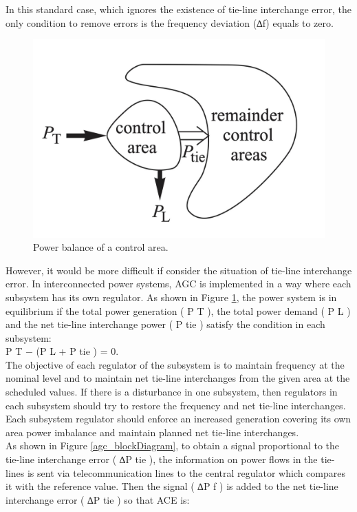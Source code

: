 \documentclass{report}
\begin{document}
In this standard case, which ignores the existence of tie-line interchange error, the only condition to remove errors is the frequency deviation (∆f) equals to zero.\\

\begin{figure}[htb]
\centering
\includegraphics[width = .618\textwidth]{Figure/controller_powerBalance.png}
\caption{Power balance of a control area.}
\label{controller_powerBalance}
\end{figure}

However, it would be more difficult if consider the situation of tie-line interchange error. In interconnected power systems, AGC is implemented in a way where each subsystem has its own regulator. As shown in Figure \ref{controller_powerBalance}, the power system is in equilibrium if the total power generation ( P T ), the total power demand ( P L ) and the net tie-line interchange power ( P tie ) satisfy the condition in each subsystem:\\
P T − (P L + P tie ) = 0.\\

The objective of each regulator of the subsystem is to maintain frequency at the nominal level and to maintain net tie-line interchanges from the given area at the scheduled values. If there is a disturbance in one subsystem, then regulators in each subsystem should try to restore the frequency and net tie-line interchanges. Each subsystem regulator should enforce an increased generation covering its own area power imbalance and maintain planned net tie-line interchanges.\\

As shown in Figure \ref{agc_blockDiagram}, to obtain a signal proportional to the tie-line interchange error ( ∆P tie ), the information on power ﬂows in the tie-lines is sent via telecommunication lines to the central regulator which compares it with the reference value. Then the signal ( ∆P f ) is added to the net tie-line interchange error ( ∆P tie ) so that ACE is: \\
\end{document}
